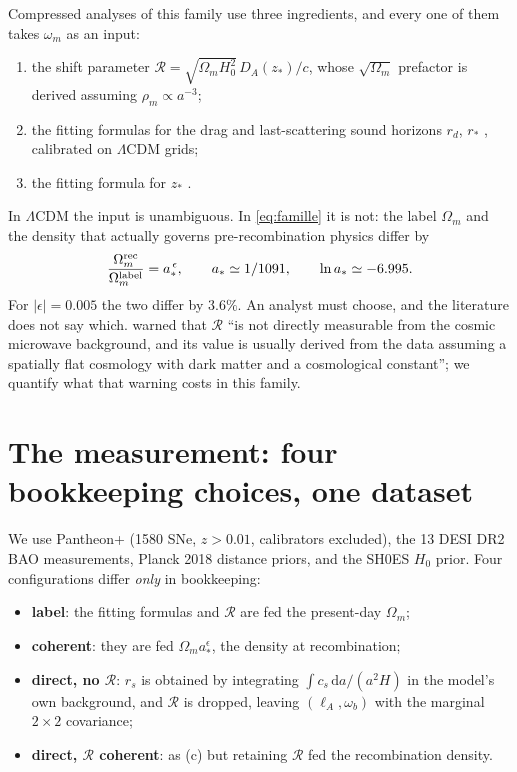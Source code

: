 \documentclass[11pt,a4paper]{article}
\begin{document}
Compressed analyses of this family use three ingredients, and every one of them takes
$\omega_m$ as an input:
\begin{enumerate}
\item the shift parameter $\mathcal{R}=\sqrt{\Omega_m H_0^2}\,D_A(z_\ast)/c$, whose
      $\sqrt{\Omega_m}$ prefactor is derived assuming $\rho_m\propto a^{-3}$;
\item the fitting formulas for the drag and last-scattering sound horizons $r_d$, $r_\ast$
      \citep{eh1998}, calibrated on $\Lambda$CDM grids;
\item the fitting formula for $z_\ast$ \citep{hs1996}.
\end{enumerate}
In $\Lambda$CDM the input is unambiguous. In \eqref{eq:famille} it is not: the label
$\Omega_m$ and the density that actually governs pre-recombination physics differ by
\begin{equation}
\frac{\Omega_m^{\rm rec}}{\Omega_m^{\rm label}} = a_\ast^{\,\epsilon},
\qquad a_\ast\simeq 1/1091,
\qquad \ln a_\ast \simeq -6.995 .
\label{eq:ratio}
\end{equation}
For $|\epsilon|=0.005$ the two differ by $3.6\%$. An analyst must choose, and the literature
does not say which. \citet{elgaroy2007} warned that $\mathcal{R}$ ``is not directly
measurable from the cosmic microwave background, and its value is usually derived from the
data assuming a spatially flat cosmology with dark matter and a cosmological constant'';
we quantify what that warning costs in this family.

\section{The measurement: four bookkeeping choices, one dataset}
\label{sec:mesure}

We use Pantheon+ (1580 SNe, $z>0.01$, calibrators excluded), the 13 DESI DR2 BAO
measurements, Planck 2018 distance priors, and the SH0ES $H_0$ prior. Four configurations
differ \emph{only} in bookkeeping:

\begin{itemize}
\item[(a)] \textbf{label}: the fitting formulas and $\mathcal{R}$ are fed the present-day
  $\Omega_m$;
\item[(b)] \textbf{coherent}: they are fed $\Omega_m a_\ast^{\epsilon}$, the density at
  recombination;
\item[(c)] \textbf{direct, no $\mathcal{R}$}: $r_s$ is obtained by integrating
  $\int c_s\,\mathrm{d}a/(a^2H)$ in the model's own background, and $\mathcal{R}$ is dropped,
  leaving $(\ell_A,\omega_b)$ with the marginal $2\times2$ covariance;
\item[(d)] \textbf{direct, $\mathcal{R}$ coherent}: as (c) but retaining $\mathcal{R}$ fed
  the recombination density.
\end{itemize}
\end{document}

